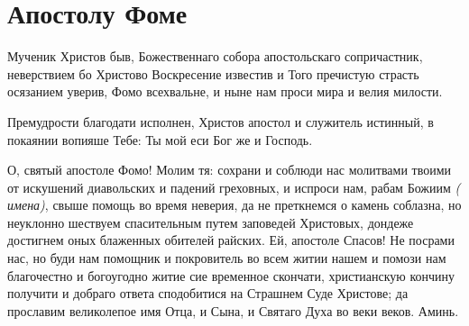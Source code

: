\section{Апостолу Фоме}\begin{mymulticols}


Мученик Христов быв, Божественнаго собора апостольскаго сопричастник, неверствием бо Христово Воскресение известив и Того пречистую страсть осязанием уверив, Фомо всехвальне, и ныне нам проси мира и велия милости.


Премудрости благодати исполнен, Христов апостол и служитель истинный, в покаянии вопияше Тебе: Ты мой еси Бог же и Господь.


О, святый апостоле Фомо! Молим тя: сохрани и соблюди нас молитвами твоими от искушений диавольских и падений греховных, и испроси нам, рабам Божиим {\itshape( имена)}, свыше помощь во время неверия, да не преткнемся о камень соблазна, но неуклонно шествуем спасительным путем заповедей Христовых, дондеже достигнем оных блаженных обителей райских. Ей, апостоле Спасов! Не посрами нас, но буди нам помощник и покровитель во всем житии нашем и помози нам благочестно и богоугодно житие сие временное скончати, христианскую кончину получити и добраго ответа сподобитися на Страшнем Суде Христове; да прославим великолепое имя Отца, и Сына, и Святаго Духа во веки веков. Аминь.

\end{mymulticols}

\mychapterending


